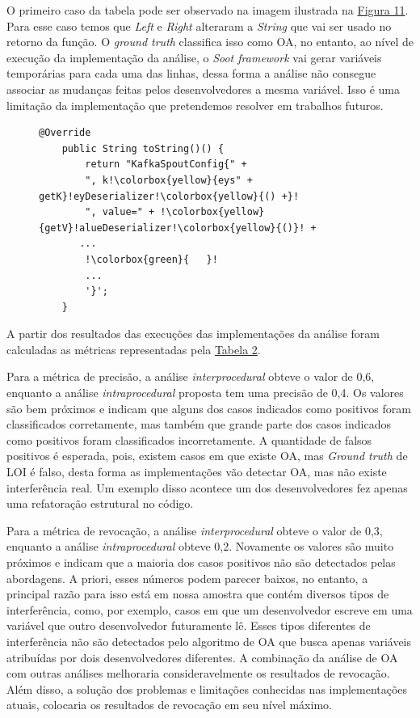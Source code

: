 O primeiro caso da tabela pode ser observado na imagem ilustrada na \hyperref[fig:ad2be67]{Figura 11}. Para esse caso temos que \emph{Left} e \emph{Right} alteraram a \emph{String} que vai ser usado no retorno da função. O \emph{ground truth} classifica isso como OA, no entanto, ao nível de execução da implementação da análise, o \emph{Soot framework} vai gerar variáveis temporárias para cada uma das linhas, dessa forma a análise não consegue associar as mudanças feitas pelos desenvolvedores a mesma variável. Isso é uma limitação da implementação que pretendemos resolver em trabalhos futuros.

\begin{figure}[h]
    \begin{lstlisting}[escapechar=!]
    @Override
    public String toString()() {
        return "KafkaSpoutConfig{" +
        ", k!\colorbox{yellow}{eys" + getK}!eyDeserializer!\colorbox{yellow}{() +}!
        ", value=" + !\colorbox{yellow}{getV}!alueDeserializer!\colorbox{yellow}{()}! +
       ...
        !\colorbox{green}{   }!
        ...
        '}';
    }
    \end{lstlisting}
    \caption{}
    \label{fig:ad2be67}
    \centering
\end{figure}

A partir dos resultados das execuções das implementações da análise foram calculadas as métricas representadas pela \hyperref[tab:metrics-loi]{Tabela 2}.

Para a métrica de precisão, a análise \emph{interprocedural} obteve o valor de 0,6, enquanto a análise \emph{intraprocedural} proposta tem uma precisão de 0,4. Os valores são bem próximos e indicam que alguns dos casos indicados como positivos foram classificados corretamente, mas também que grande parte dos casos indicados como positivos foram classificados incorretamente. A quantidade de falsos positivos é esperada, pois, existem casos em que existe OA,
mas \emph{Ground truth} de LOI é falso, desta forma as implementações vão detectar OA, mas não existe interferência real. Um exemplo disso acontece um dos desenvolvedores fez apenas uma refatoração estrutural no código.

Para a métrica de revocação, a análise \emph{interprocedural} obteve o valor de 0,3, enquanto a análise \emph{intraprocedural} obteve 0,2. Novamente os valores são muito próximos e indicam que a maioria dos casos positivos não são detectados pelas abordagens. A priori, esses números podem parecer baixos, no entanto, a principal razão para isso está em nossa amostra que contém diversos tipos de interferência, como, por exemplo, casos em que um desenvolvedor escreve em uma variável que outro desenvolvedor futuramente lê. Esses tipos diferentes de interferência não são detectados pelo algoritmo de OA que busca apenas variáveis atribuídas por dois desenvolvedores diferentes. A combinação da análise de OA com outras análises melhoraria consideravelmente os resultados de revocação. Além disso, a solução dos problemas e limitações conhecidas nas implementações atuais, colocaria os resultados de revocação em seu nível máximo. 

